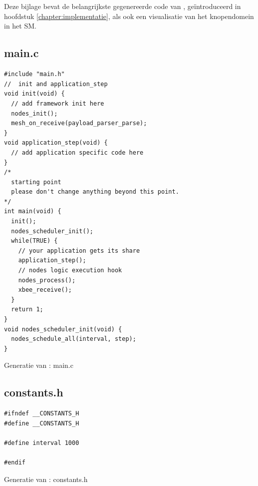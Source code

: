 
\chapter{}
\label{appendix:hello-srcs}

Deze bijlage bevat de belangrijkste gegenereerde code van ,
ge\"introduceerd in hoofdstuk \ref{chapter:implementatie}, als ook een
visualisatie van het knopendomein in het SM.

\section{main.c}
\vspace{-5mm}
\begin{listing}[H]
  \begin{verbatim}
#include "main.h"
//  init and application_step
void init(void) {
  // add framework init here
  nodes_init();
  mesh_on_receive(payload_parser_parse);
}
void application_step(void) {
  // add application specific code here
}
/*
  starting point
  please don't change anything beyond this point.
*/
int main(void) {
  init();
  nodes_scheduler_init();
  while(TRUE) {
    // your application gets its share
    application_step();
    // nodes logic execution hook
    nodes_process();
    xbee_receive();
  }
  return 1;
}
void nodes_scheduler_init(void) {
  nodes_schedule_all(interval, step);
}
  \end{verbatim}
  \vspace{-5mm}
  \caption{Generatie van : main.c}
\end{listing}

\section{constants.h}
\vspace{-5mm}
\begin{listing}[H]
  \begin{verbatim}
#ifndef __CONSTANTS_H
#define __CONSTANTS_H

#define interval 1000

#endif
  \end{verbatim}
  \vspace{-5mm}
  \caption{Generatie van : constants.h}
\end{listing}

